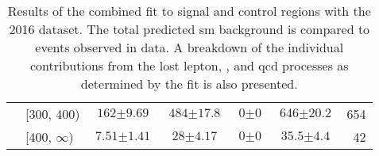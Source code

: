 \begin{table}[htbp]
\begin{tabular*}{\linewidth}{@{\extracolsep{\fill}}llccccr}
        & [300, 400) &   $\text{162} \pm \text{9.69}$ &    $\text{484} \pm \text{17.8}$ &     $\text{0} \pm \text{0}$ &    $\text{646} \pm \text{20.2}$ &   654\\
        & [400, $\infty$) &    $\text{7.51} \pm \text{1.41}$ &     $\text{28} \pm \text{4.17}$ &     $\text{0} \pm \text{0}$ &      $\text{35.5} \pm \text{4.4}$ &    42\\
    \bottomrule
    \end{tabular*}
    \caption[Results of the combined fit to signal and control regions with the 2016 dataset]{Results of the combined fit to signal and control regions with the 2016 dataset. The total predicted \acrlong{sm} background is compared to events observed in data. A breakdown of the individual contributions from the lost lepton, \ztonunu, and \acrshort{qcd} processes as determined by the fit is also presented.}
    \label{tab:yields_SR_B_only_2016}
\end{table}


